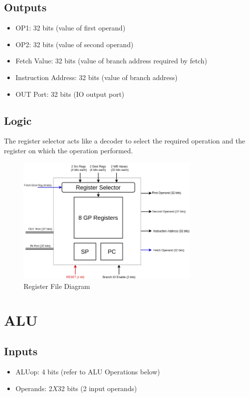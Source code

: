 \documentclass[12pt]{report}
\begin{document}
\subsection{Outputs}
\begin{itemize}
    \item OP1: 32 bits (value of first operand)
    \item OP2: 32 bits (value of second operand)
    \item Fetch Value: 32 bits (value of branch address required by fetch)
    \item Instruction Address: 32 bits (value of branch address)
    \item OUT Port: 32 bits (IO output port)
\end{itemize}

\subsection{Logic}
The register selector acts like a decoder to select the required operation and the register on which the operation performed.

\begin{center}
    \begin{figure}[hp]
        \centering
        \includegraphics[width=0.8\textwidth]{images/reg_file}
        \caption{Register File Diagram}
        \label{fig:reg_file}
    \end{figure}
\end{center}

\section{ALU}

\subsection{Inputs}
\begin{itemize}
    \item ALUop: 4 bits (refer to ALU Operations below)
    \item Operands: 2$X$32 bits (2 input operands)
\end{itemize}
\end{document}
